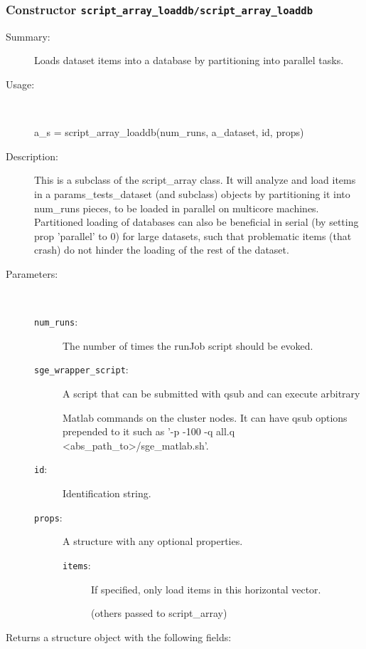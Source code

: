\subsubsection[Constructor \texttt{script\_array\_loaddb}]{Constructor \texttt{script\_array\_loaddb/script\_array\_loaddb}}%
%
\label{ref_script_array_loaddb__script_array_loaddb}%
\hypertarget{ref_script_array_loaddb__script_array_loaddb}{}%
\begin{description}
\item[Summary:]Loads dataset items into a database by partitioning into parallel tasks.
%
\item[Usage:]~%
\begin{lyxcode}%
a\_s = script\_array\_loaddb(num\_runs, a\_dataset, id, props)
%
\end{lyxcode}%
%
\item[Description:]%
This is a subclass of the script\_array class. It will analyze and load
 items in a params\_tests\_dataset (and subclass) objects by partitioning it
 into num\_runs pieces, to be loaded in parallel on multicore
 machines. Partitioned loading of databases can also be beneficial in
 serial (by setting prop 'parallel' to 0) for large datasets, such that
 problematic items (that crash) do not hinder the loading of the rest of
 the dataset.
\item[Parameters:]~
\begin{description}%
\item[\texttt{num\_runs}:]
 The number of times the runJob script should be evoked.
\item[\texttt{sge\_wrapper\_script}:]
 A script that can be submitted with qsub and can execute arbitrary

Matlab commands on the cluster nodes. It can have qsub options prepended to it
such as '-p -100 -q all.q <abs\_path\_to>/sge\_matlab.sh'.
\item[\texttt{id}:]
 Identification string.
\item[\texttt{props}:]
 A structure with any optional properties.
\begin{description}%
\item[\texttt{items}:]
 If specified, only load items in this horizontal vector.

(others passed to script\_array)
\end{description}%
\end{description}%
%
\item[Returns a structure object with the following fields:
]~


\end{description}
